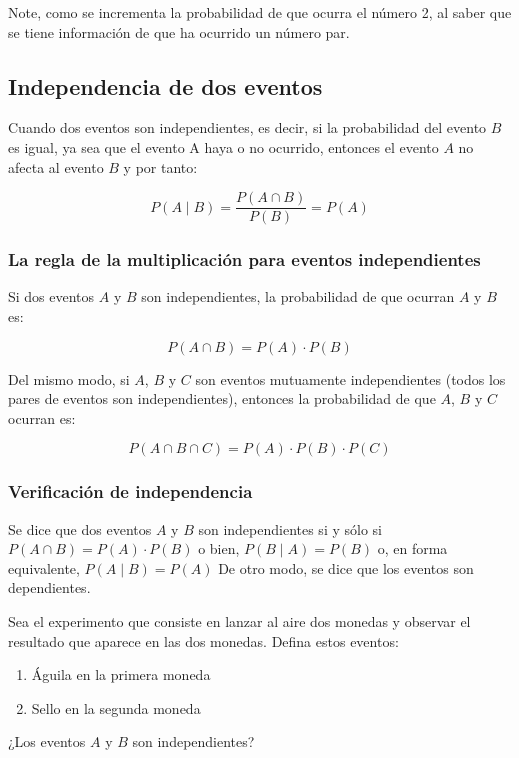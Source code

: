 Note, como se incrementa la probabilidad de que ocurra el número 2,
al saber que se tiene información de que ha ocurrido un número par.



\subsection{Independencia de dos eventos}

Cuando dos eventos son independientes, es decir, si la
probabilidad del evento $B$ es igual, ya sea que el evento A
haya o no ocurrido, entonces el evento $A$ no afecta al
evento $B$ y por tanto:

\begin{equation}
    P( A\mid  B)=\frac{P( A\cap B)}{P(B)}=P(A)
\end{equation}


\subsubsection{La regla de la multiplicación para eventos independientes}

Si dos eventos $A$ y $B$ son independientes, la probabilidad
de que ocurran $A$ y $B$ es:

\begin{equation}
    P(A \cap B) =P(A)\cdot P(B)
\end{equation}

Del mismo modo, si $A$, $B$ y $C$ son eventos mutuamente
independientes (todos los pares de eventos son
independientes), entonces la probabilidad de que $A$, $B$ y $C$
ocurran es:

\begin{equation}
    P(A \cap B \cap C)= P(A)\cdot P(B)\cdot P(C)
\end{equation}


\subsubsection{Verificación de independencia}

Se dice que dos eventos $A$ y $B$ son independientes si y sólo si $P(A \cap B)=P(A)\cdot P(B)$
o bien, $P(B \mid  A) =P(B)$ o, en forma equivalente, $P(A \mid  B) = P(A)$
De otro modo, se dice que los eventos son dependientes.


\begin{example}
    Sea el experimento que consiste en lanzar al aire dos monedas y
    observar el resultado que aparece en las dos monedas. Defina estos
    eventos:
    \begin{enumerate}
        \item Águila en la primera moneda
        \item Sello en la segunda moneda
    \end{enumerate}

    ¿Los eventos $A$ y $B$ son independientes?
\end{example}

